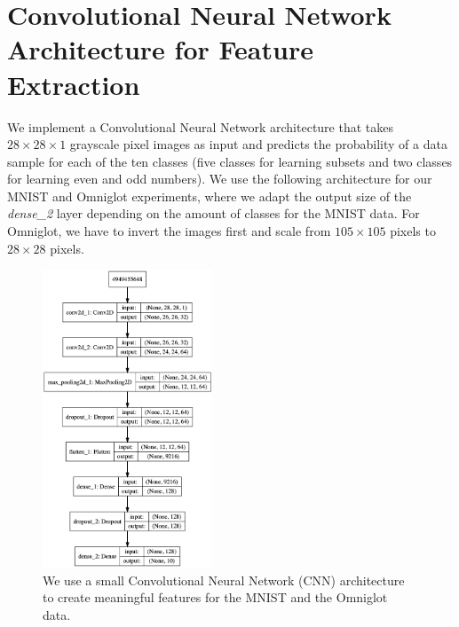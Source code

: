 \chapter{Convolutional Neural Network Architecture for Feature Extraction}
\label{sec:cnnarchitecture}

We implement a Convolutional Neural Network architecture that takes $28 \times 28 \times 1$ grayscale pixel images as input and predicts the probability of a data sample for each of the ten classes (five classes for learning subsets and two classes for learning even and odd numbers). We use the following architecture for our MNIST and Omniglot experiments, where we adapt the output size of the \textit{dense\_2} layer depending on the amount of classes for the MNIST data. For Omniglot, we have to invert the images first and scale from $105 \times 105$ pixels to $28 \times 28$ pixels.

\begin{figure}[H]
    \centering
    \includegraphics[width=0.45\textwidth]{images/model}
    \caption{We use a small Convolutional Neural Network (CNN) architecture to create meaningful features for the MNIST and the Omniglot data.}
    \label{fig:model}
\end{figure}